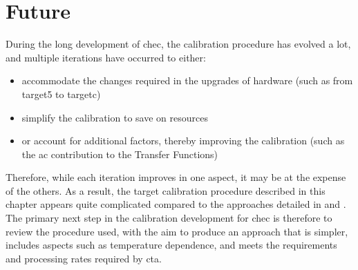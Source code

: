 \section{Future}

During the long development of \gls{chec}, the calibration procedure has evolved a lot, and multiple iterations have occurred to either:
\begin{itemize}
	\item accommodate the changes required in the upgrades of hardware (such as from \gls{target5} to \gls{targetc})
	\item simplify the calibration to save on resources
	\item or account for additional factors, thereby improving the calibration (such as the \gls{ac} contribution to the Transfer Functions)
\end{itemize}
Therefore, while each iteration improves in one aspect, it may be at the expense of the others. As a result, the \gls{target} calibration procedure described in this chapter appears quite complicated compared to the approaches detailed in \cite{Bechtol2012} and \cite{Albert2017}. The primary next step in the calibration development for \gls{chec} is therefore to review the procedure used, with the aim to produce an approach that is simpler, includes aspects such as temperature dependence, and meets the requirements and processing rates required by \gls{cta}.
